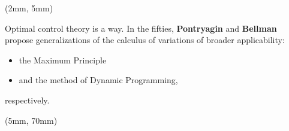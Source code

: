{%
\begin{frame}{}
    \begin{textblock*}{55mm}(2mm, 5mm)
        \begin{beamerboxesrounded}{Optimal control theory is a way.}
                In the fifties, \textbf{Pontryagin} and
            \textbf{Bellman} propose generalizations of the calculus
            of variations of broader applicability:
            \begin{itemize}
                \item
                    the Maximum Principle
                \item
                    and the method of Dynamic Programming,
            \end{itemize}
            respectively.
        \end{beamerboxesrounded}
    \end{textblock*}
%
    \begin{textblock*}{120mm}(5mm, 70mm)
        \begin{beamerboxesrounded}{}
            \begin{bibunit}[apalike]
                \nocite{lenhart2007optimal}
                \putbib
            \end{bibunit}
        \end{beamerboxesrounded}
    \end{textblock*}
\end{frame}
}
